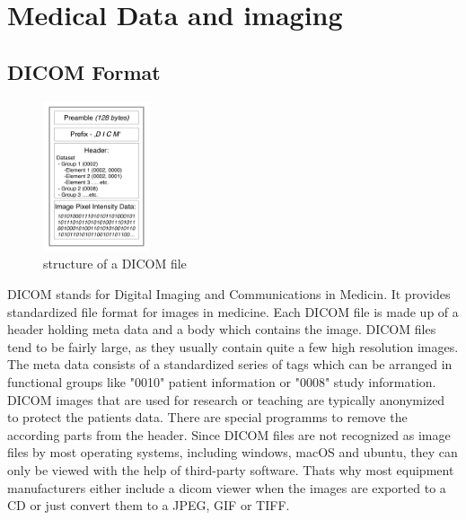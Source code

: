 \chapter{Medical Data and imaging}
  \label{Medical Data and imaging}
\section{DICOM Format}
\begin{figure}
    \vspace{-10pt}
   \centering
   \includegraphics[width=0.28\textwidth]{figures/dicom.jpeg}
    \caption{structure of a DICOM file }
    \label{figure 2.1}
    \vspace{-15pt}
\end{figure}
DICOM  stands for Digital Imaging and Communications in Medicin. It provides standardized file format for images in medicine. Each DICOM file is made up of a header holding meta data and a body which contains the image. DICOM files tend to be fairly large, as they usually contain quite a few high resolution images. The meta data consists of a standardized series of tags which can be arranged in functional groups like "0010" patient information or "0008" study information.
DICOM images that are used for research or teaching are typically anonymized to protect the patients data. There are special programms to remove the according parts from the header.
Since DICOM files are not recognized as image files by most operating systems, including windows, macOS and ubuntu, they can only be viewed with the help of third-party software.
Thats why most equipment manufacturers either include a dicom viewer when the images are exported to a CD or just convert them to a JPEG, GIF or TIFF.
\cite{varmaManagingDICOMImages2012}
 \cite{ElsevierEnhancedReader}

